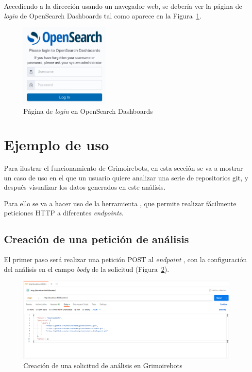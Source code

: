 Accediendo a la dirección  usando un navegador web, se debería ver la página de \emph{login} de OpenSearch Dashboards tal como aparece en la Figura~\ref{fig:opensearch-dashboards-login}.

\begin{figure}[ht]
    \centering
    \includegraphics[width=0.4\textwidth]{Figures/opensearch-dashboards-login}
    \decoRule
    \caption[OpenSearch Dashboards (\emph{Login})]{Página de \emph{login} en OpenSearch Dashboards}
    \label{fig:opensearch-dashboards-login}
\end{figure}

\section{Ejemplo de uso} \label{sec:ejemplo-de-uso}

Para ilustrar el funcionamiento de Grimoirebots, en esta sección se va a mostrar un caso de uso en el que un usuario quiere analizar una serie de repositorios git, y después visualizar los datos generados en este análisis.

Para ello se va a hacer uso de la herramienta , que permite realizar fácilmente peticiones HTTP a diferentes \emph{endpoints}.

\subsection{Creación de una petición de análisis}

El primer paso será realizar una petición POST al \emph{endpoint} , con la configuración del análisis en el campo \emph{body} de la solicitud (Figura~\ref{fig:example1}).

\begin{figure}[ht]
    \centering
    \includegraphics[width=\textwidth]{Figures/example1}
    \decoRule
    \caption[Grimoirebots (Creación de análisis)]{Creación de una solicitud de análisis en Grimoirebots}
    \label{fig:example1}
\end{figure}

